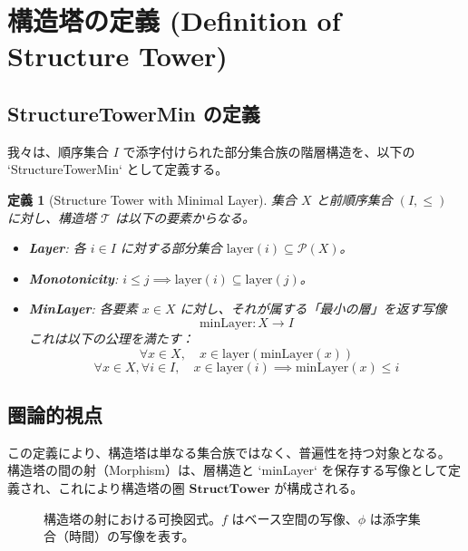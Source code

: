 \documentclass[11pt, a4paper]{article}
\newtheorem{definition}[theorem]{定義}
\begin{document}
\section{構造塔の定義 (Definition of Structure Tower)}

\subsection{StructureTowerMin の定義}
我々は、順序集合 $I$ で添字付けられた部分集合族の階層構造を、以下の `StructureTowerMin` として定義する。

\begin{definition}[Structure Tower with Minimal Layer]
集合 $X$ と前順序集合 $(I, \le)$ に対し、構造塔 $\mathcal{T}$ は以下の要素からなる。
\begin{itemize}
    \item \textbf{Layer}: 各 $i \in I$ に対する部分集合 $\text{layer}(i) \subseteq \mathcal{P}(X)$。
    \item \textbf{Monotonicity}: $i \le j \implies \text{layer}(i) \subseteq \text{layer}(j)$。
    \item \textbf{MinLayer}: 各要素 $x \in X$ に対し、それが属する「最小の層」を返す写像
    $$ \text{minLayer} : X \to I $$
    これは以下の公理を満たす：
    $$ \forall x \in X, \quad x \in \text{layer}(\text{minLayer}(x)) $$
    $$ \forall x \in X, \forall i \in I, \quad x \in \text{layer}(i) \implies \text{minLayer}(x) \le i $$
\end{itemize}
\end{definition}

\subsection{圏論的視点}
この定義により、構造塔は単なる集合族ではなく、普遍性を持つ対象となる。
構造塔の間の射（Morphism）は、層構造と `minLayer` を保存する写像として定義され、これにより構造塔の圏 $\mathbf{StructTower}$ が構成される。

\begin{figure}[htbp]
  \centering
  \caption{構造塔の射における可換図式。$f$ はベース空間の写像、$\phi$ は添字集合（時間）の写像を表す。}
  \label{fig:category_diagram}
\end{figure}
\end{document}
